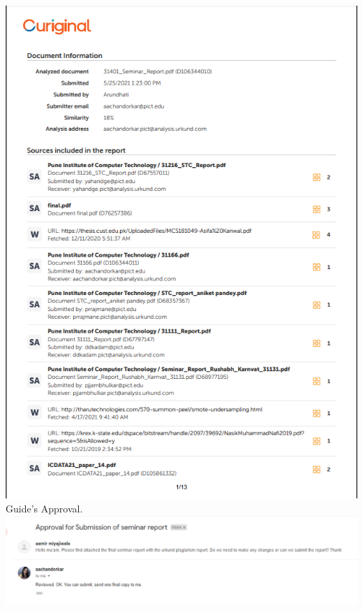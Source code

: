 \documentclass[a4paper, 12pt]{article}
\begin{document}
\includegraphics[width=\linewidth]{./plagiarism}
\newpage
Guide's Approval.\\
\includegraphics[width=\linewidth]{./approval}
\end{document}

